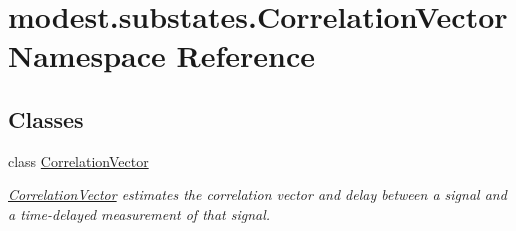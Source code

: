 \hypertarget{namespacemodest_1_1substates_1_1CorrelationVector}{}\section{modest.\+substates.\+Correlation\+Vector Namespace Reference}
\label{namespacemodest_1_1substates_1_1CorrelationVector}
\subsection*{Classes}
\begin{DoxyCompactItemize}
\item 
class \hyperlink{classmodest_1_1substates_1_1CorrelationVector_1_1CorrelationVector}{Correlation\+Vector}
\begin{DoxyCompactList}\small\item\em \hyperlink{classmodest_1_1substates_1_1CorrelationVector_1_1CorrelationVector}{Correlation\+Vector} estimates the correlation vector and delay between a signal and a time-\/delayed measurement of that signal. \end{DoxyCompactList}\end{DoxyCompactItemize}
